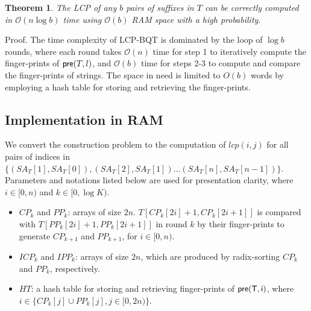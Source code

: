 \documentclass{llncs}
\newtheorem{thm}{Theorem}
\begin{document}
\begin{thm}
\label{thm:lcp:naive}
The {LCP} of any $b$ pairs of suffixes in $T$ can be correctly computed in $\mathcal{O}(n\log b)$ time using $\mathcal{O}(b)$ {RAM} space with a high probability.
\end{thm}
Proof. The time complexity of {LCP-BQT} is dominated by the loop of $\log b$ rounds, where each round takes $\mathcal{O}(n)$ time for step 1 to iteratively compute the finger-prints of ${\sf pre}(T,l)$, and $\mathcal{O}(b)$ time for steps 2-3 to compute and compare the finger-prints of strings. The space in need is limited to $O(b)$ words by employing a hash table for storing and  retrieving the finger-prints.


\subsection{Implementation in RAM}\label{subsec:implementation_in_ram}

We convert the construction problem to the computation of $lcp(i,j)$ for all pairs of indices in $\{(SA_T[1], SA_T[0]),(SA_T[2], SA_T[1])\ldots (SA_T[n], SA_T[n-1])\}$. Parameters and notations listed below are used for presentation clarity, where $i\in [0,n)$ and $k\in [0,\log K)$.

\begin{itemize}
\item $CP_k$ and $PP_k$: arrays of size $2n$. $T[CP_k[2i]+1,CP_k[2i+1]]$ is compared with $T[PP_k[2i]+1,PP_k[2i+1]]$ in round $k$ by their finger-prints to generate $CP_{k+1}$ and $PP_{k+1}$, for $i\in [0,n)$.
\item $ICP_k$ and $IPP_k$: arrays of size $2n$, which are produced by radix-sorting $CP_k$ and $PP_k$, respectively.
\item $HT$: a hash table for storing and retrieving finger-prints of ${\sf pre(T,i)}$, where $i\in \{CP_k[j] \cup PP_k[j], j\in[0,2n)\}$.
\end{itemize}
\end{document}

